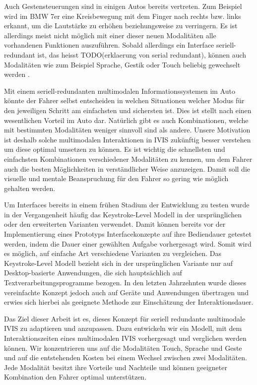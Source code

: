 Auch Gestensteuerungen sind in einigen Autos bereits vertreten.
Zum Beispiel wird im BMW 7er eine Kreisbewegung mit dem Finger nach rechts bzw. links erkannt, um die Lautstärke zu erhöhen beziehungsweise zu verringern. 
Es ist allerdings meist nicht möglich mit einer dieser neuen Modalitäten alle vorhandenen Funktionen auszuführen.
Sobald allerdings ein Interface seriell-redundant ist, das heisst TODO(erklaerung von serial redundant), können auch Modalitäten wie zum Beispiel Sprache, Gestik oder Touch beliebig gewechselt werden \citep{neuss_2001}. 

Mit einem seriell-redundanten multimodalen Informationssystemen im Auto könnte der Fahrer selbst entscheiden in welchen Situationen welcher Modus für den jeweiligen Schritt am einfachsten und sichersten ist.
Dies ist stellt nach \citet{Muller_2011} einen wesentlichen Vorteil im Auto dar.
Natürlich gibt es auch Kombinationen, welche mit bestimmten Modalitäten weniger sinnvoll sind als andere.
Unsere Motivation ist deshalb solche multimodalen Interaktionen in IVIS zukünftig besser verstehen um diese optimal umsetzen zu können.
Es ist wichtig die schnellsten und einfachsten Kombinationen verschiedener Modalitäten zu kennen, um dem Fahrer auch die besten Möglichkeiten in verständlicher Weise anzuzeigen.
Damit soll die visuelle und mentale Beanspruchung für den Fahrer so gering wie möglich gehalten werden. 

Um Interfaces bereits in einem frühen Stadium der Entwicklung zu testen wurde in der Vergangenheit häufig das Keystroke-Level Modell in der ursprünglichen oder den erweiterten Varianten verwendet.
Damit können bereits vor der Implementierung eines Prototyps Interfacekonzepte auf ihre Bediendauer getestet werden, indem die Dauer einer gewählten Aufgabe vorhergesagt wird.
Somit wird es möglich, auf einfache Art verschiedene Varianten zu vergleichen.
Das Keystroke-Level Modell bezieht sich in der ursprünglichen Variante nur auf Desktop-basierte Anwendungen, die sich hauptsächlich auf Textverarbeitungsprogramme bezogen.
In den letzten Jahrzehnten wurde dieses vereinfachte Konzept jedoch auch auf Geräte und Anwendungen übertragen und erwies sich hierbei als geeignete Methode zur Einschätzung der Interaktionsdauer. 

Das Ziel dieser Arbeit ist es, dieses Konzept für seriell redundante multimodale IVIS zu adaptieren und anzupassen.
Dazu entwickeln wir ein Modell, mit dem Interaktionszeiten eines multimodalen IVIS vorhergesagt und verglichen werden können.
Wir konzentrieren uns auf die Modalitäten Touch, Sprache und Geste und auf die entstehenden Kosten bei einem Wechsel zwischen zwei Modalitäten.
Jede Modalität besitzt ihre Vorteile und Nachteile und können geeigneter Kombination den Fahrer optimal unterstützen.

